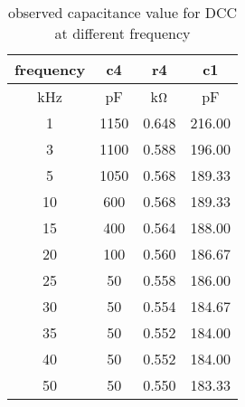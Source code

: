 \begin{table}[H]
    \centering
    \begin{tabular}{|c|c|c|c|}
        \hline
        frequency & c4   & r4      & c1     \\ \hline
        kHz       & pF   & k$\ohm$ & pF     \\ \hline
        1         & 1150 & 0.648   & 216.00 \\ \hline
        3         & 1100 & 0.588   & 196.00 \\ \hline
        5         & 1050 & 0.568   & 189.33 \\ \hline
        10        & 600  & 0.568   & 189.33 \\ \hline
        15        & 400  & 0.564   & 188.00 \\ \hline
        20        & 100  & 0.560   & 186.67 \\ \hline
        25        & 50   & 0.558   & 186.00 \\ \hline
        30        & 50   & 0.554   & 184.67 \\ \hline
        35        & 50   & 0.552   & 184.00 \\ \hline
        40        & 50   & 0.552   & 184.00 \\ \hline
        50        & 50   & 0.550   & 183.33 \\ \hline
    \end{tabular}
    \caption{observed capacitance value for DCC at different frequency}
    \label{tab:3}
\end{table}